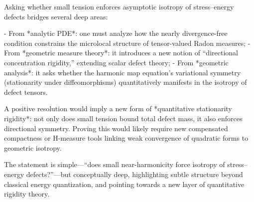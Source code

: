 Asking whether small tension enforces asymptotic isotropy of stress–energy defects bridges several deep areas:

- From *analytic PDE*: one must analyze how the nearly divergence-free condition constrains the microlocal structure of tensor-valued Radon measures;
- From *geometric measure theory*: it introduces a new notion of “directional concentration rigidity,” extending scalar defect theory;
- From *geometric analysis*: it asks whether the harmonic map equation’s variational symmetry (stationarity under diffeomorphisms) quantitatively manifests in the isotropy of defect tensors.

A positive resolution would imply a new form of *quantitative stationarity rigidity*: not only does small tension bound total defect mass, it also enforces directional symmetry. Proving this would likely require new compensated compactness or H-measure tools linking weak convergence of quadratic forms to geometric isotropy.  

The statement is simple—“does small near-harmonicity force isotropy of stress–energy defects?”—but conceptually deep, highlighting subtle structure beyond classical energy quantization, and pointing towards a new layer of quantitative rigidity theory.